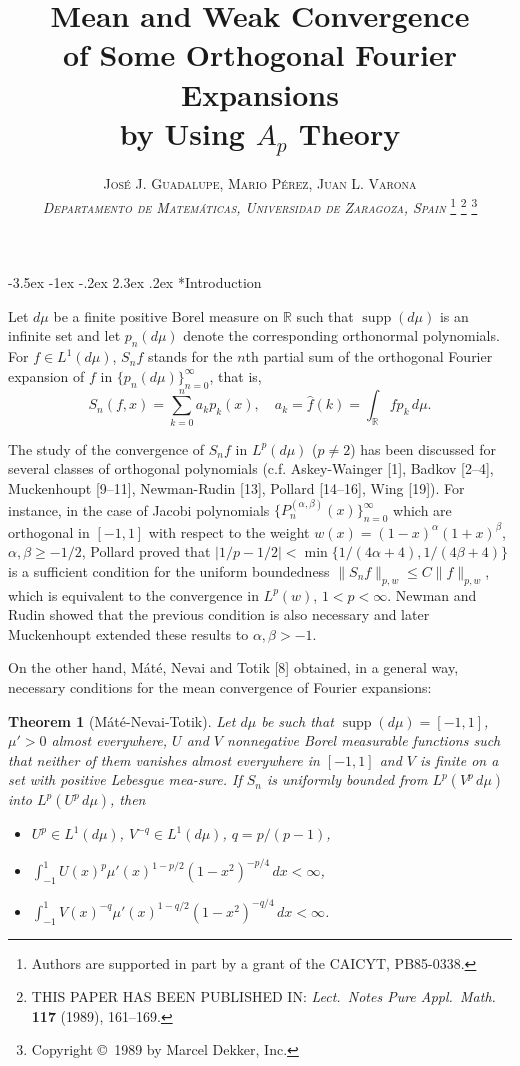 \documentclass[11pt,a4paper]{article}
\title{Mean and Weak Convergence\\ of Some Orthogonal Fourier Expansions\\ 
by Using $A_{p}$ Theory}
\author{\scshape Jos\'e J. Guadalupe, 
Mario P\'erez, Juan L. Varona\\[5pt]
\textit{Departamento de Matem\'aticas,}
\textit{Universidad de Zaragoza, Spain}%
\renewcommand\thefootnote{}%
\renewcommand\footnotemark{}%
\footnote{Authors are supported in part 
by a grant of the CAICYT, PB85-0338.}%
\footnote{THIS PAPER HAS BEEN PUBLISHED IN:
\textit{Lect.\ Notes Pure Appl.\ Math.\@}
\textbf{117} (1989), 161--169.}%
\footnote{Copyright \copyright\ 1989 by Marcel Dekker, Inc.}%
}
\date{}
\makeatletter
\newcommand{\R}{\mathbb{R}}
\newcommand{\supp}{\operatorname{supp}}
\renewcommand\section{\@startsection {section}{1}{\z@}%
                                   {-3.5ex \@plus -1ex \@minus -.2ex}%
                                   {2.3ex \@plus.2ex}%
                                   {\centering \normalfont\large\bfseries}}
\theoremstyle{plain}
\newtheorem*{theoMNT}{Theorem}
\theoremstyle{definition}
\theoremstyle{remark}
\makeatother
\begin{document}

\maketitle


\section*{Introduction}

Let $d\mu$ be a finite positive Borel measure on $\R$ such that 
$\supp(d\mu)$ is an infinite set and let $p_{n}(d\mu)$ denote 
the corresponding orthonormal polynomials. For $f \in L^{1}(d\mu)$, 
$S_{n}f$ stands for the $n$th partial sum of the orthogonal Fourier 
expansion of $f$ in $\{p_{n}(d\mu)\}_{n=0}^{\infty}$, 
that is,
$$
S_{n}(f,x) = \sum_{k=0}^{n} a_{k}p_{k}(x),
\quad a_{k} = \widehat{f}(k) 
= \int_{\R} fp_{k}\,d\mu.
$$

The study of the convergence of $S_{n}f$ in $L^{p}(d\mu)$ ($p \neq 2$)
has been discussed for several classes of orthogonal polynomials 
(c.f. Askey-Wainger [1], Badkov [2--4], Muckenhoupt [9--11], Newman-Rudin 
[13], Pollard [14--16], Wing [19]). For instance, in the case 
of Jacobi polynomials $\{P^{(\alpha,\beta)}_{n}(x)\}_{n=0}^{\infty}$ 
which are orthogonal in $[-1,1]$ with respect to the weight $w(x) 
= (1-x)^{\alpha}(1+x)^{\beta}$, $\alpha, \beta \geq -1/2$,
Pollard proved that
$|1/p-1/2| < \min\{1/(4\alpha+4),1/(4\beta+4)\}$ 
is a sufficient condition for the uniform boundedness
$\|S_{n}f\|_{p,w} \leq C\|f\|_{p,w}$, 
which is equivalent to the convergence in $L^{p}(w)$, $1 < p < \infty$. 
Newman and Rudin showed that the previous condition is also necessary 
and later Muckenhoupt extended these results to $\alpha, \beta > -1$.

On the other hand, M\'at\'e, Nevai and Totik [8] obtained, in 
a general way, necessary conditions for the mean convergence 
of Fourier expansions:

\begin{theoMNT}[M\'at\'e-Nevai-Totik]
Let $d\mu$ be such that $\supp(d\mu) = [-1,1]$,
$\mu' > 0$ almost everywhere, $U$ and $V$ nonnegative 
Borel measurable functions such that neither of them vanishes 
almost everywhere in $[-1,1]$ and $V$ is finite on a set with positive 
Lebesgue mea-sure. If $S_{n}$ is uniformly bounded from $L^{p}(V^{p}\,d\mu)$ 
into $L^{p}(U^{p}\,d\mu)$, then
\begin{itemize}
\item[(i)] $U^{p} \in L^{1}(d\mu)$, $V^{-q} \in L^{1}(d\mu)$, 
$q = p/(p-1)$,
\item[(ii)] $\displaystyle \int_{-1}^{1} U(x)^{p} \mu'(x)^{1-p/2}
(1-x^{2})^{-p/4}\,dx < \infty$,
\item[(iii)] $\displaystyle \int_{-1}^{1} V(x)^{-q} \mu'(x)^{1-q/2}
(1-x^{2})^{-q/4}\,dx < \infty$.
\end{itemize}
\end{theoMNT}
\end{document}
